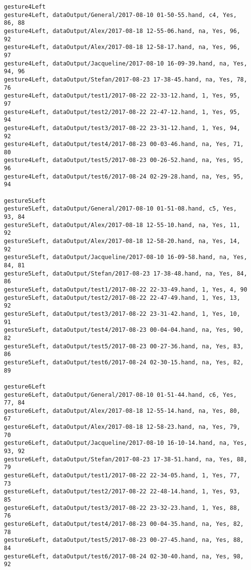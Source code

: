 \begin{verbatim}
gesture4Left
gesture4Left, dataOutput/General/2017-08-10 01-50-55.hand, c4, Yes, 86, 88
gesture4Left, dataOutput/Alex/2017-08-18 12-55-06.hand, na, Yes, 96, 92
gesture4Left, dataOutput/Alex/2017-08-18 12-58-17.hand, na, Yes, 96, 97
gesture4Left, dataOutput/Jacqueline/2017-08-10 16-09-39.hand, na, Yes, 94, 96
gesture4Left, dataOutput/Stefan/2017-08-23 17-38-45.hand, na, Yes, 78, 76
gesture4Left, dataOutput/test1/2017-08-22 22-33-12.hand, 1, Yes, 95, 97
gesture4Left, dataOutput/test2/2017-08-22 22-47-12.hand, 1, Yes, 95, 94
gesture4Left, dataOutput/test3/2017-08-22 23-31-12.hand, 1, Yes, 94, 92
gesture4Left, dataOutput/test4/2017-08-23 00-03-46.hand, na, Yes, 71, 80
gesture4Left, dataOutput/test5/2017-08-23 00-26-52.hand, na, Yes, 95, 96
gesture4Left, dataOutput/test6/2017-08-24 02-29-28.hand, na, Yes, 95, 94

gesture5Left
gesture5Left, dataOutput/General/2017-08-10 01-51-08.hand, c5, Yes, 93, 84
gesture5Left, dataOutput/Alex/2017-08-18 12-55-10.hand, na, Yes, 11, 92
gesture5Left, dataOutput/Alex/2017-08-18 12-58-20.hand, na, Yes, 14, 92
gesture5Left, dataOutput/Jacqueline/2017-08-10 16-09-58.hand, na, Yes, 84, 81
gesture5Left, dataOutput/Stefan/2017-08-23 17-38-48.hand, na, Yes, 84, 86
gesture5Left, dataOutput/test1/2017-08-22 22-33-49.hand, 1, Yes, 4, 90
gesture5Left, dataOutput/test2/2017-08-22 22-47-49.hand, 1, Yes, 13, 92
gesture5Left, dataOutput/test3/2017-08-22 23-31-42.hand, 1, Yes, 10, 91
gesture5Left, dataOutput/test4/2017-08-23 00-04-04.hand, na, Yes, 90, 82
gesture5Left, dataOutput/test5/2017-08-23 00-27-36.hand, na, Yes, 83, 86
gesture5Left, dataOutput/test6/2017-08-24 02-30-15.hand, na, Yes, 82, 89

gesture6Left
gesture6Left, dataOutput/General/2017-08-10 01-51-44.hand, c6, Yes, 77, 84
gesture6Left, dataOutput/Alex/2017-08-18 12-55-14.hand, na, Yes, 80, 67
gesture6Left, dataOutput/Alex/2017-08-18 12-58-23.hand, na, Yes, 79, 70
gesture6Left, dataOutput/Jacqueline/2017-08-10 16-10-14.hand, na, Yes, 93, 92
gesture6Left, dataOutput/Stefan/2017-08-23 17-38-51.hand, na, Yes, 88, 79
gesture6Left, dataOutput/test1/2017-08-22 22-34-05.hand, 1, Yes, 77, 73
gesture6Left, dataOutput/test2/2017-08-22 22-48-14.hand, 1, Yes, 93, 85
gesture6Left, dataOutput/test3/2017-08-22 23-32-23.hand, 1, Yes, 88, 76
gesture6Left, dataOutput/test4/2017-08-23 00-04-35.hand, na, Yes, 82, 78
gesture6Left, dataOutput/test5/2017-08-23 00-27-45.hand, na, Yes, 88, 84
gesture6Left, dataOutput/test6/2017-08-24 02-30-40.hand, na, Yes, 98, 92


\end{verbatim}
